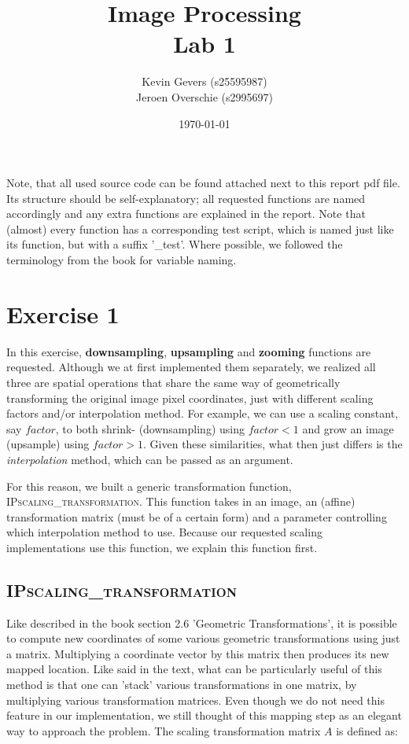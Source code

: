 \documentclass{article}
\title{Image Processing\\
    Lab 1}
\author{Kevin Gevers (s25595987) \\ Jeroen Overschie (s2995697)}
\date{\today}
\begin{document}
\maketitle

Note, that all used source code can be found attached next to this report pdf file. Its structure should be self-explanatory; all requested functions are named accordingly and any extra functions are explained in the report. Note that (almost) every function has a corresponding test script, which is named just like its function, but with a suffix '\_test'. Where possible, we followed the terminology from the book \citep{gonzalez2008digital} for variable naming.

\section*{Exercise 1}
In this exercise, \textbf{downsampling}, \textbf{upsampling} and \textbf{zooming} functions are requested. Although we at first implemented them separately, we realized all three are spatial operations that share the same way of geometrically transforming the original image pixel coordinates, just with different scaling factors and/or interpolation method. For example, we can use a scaling constant, say $factor$, to both shrink- (downsampling) using $factor < 1$ and grow an image (upsample) using $factor > 1$. Given these similarities, what then just differs is the \textit{interpolation} method, which can be passed as an argument.

For this reason, we built a generic transformation function, \textsc{IPscaling\_transformation}. This function takes in an image, an (affine) transformation matrix (must be of a certain form) and a parameter controlling which interpolation method to use. Because our requested scaling implementations use this function, we explain this function first.

\subsection*{\textsc{IPscaling\_transformation}}
Like described in the book \citep{gonzalez2008digital} section 2.6 'Geometric Transformations', it is possible to compute new coordinates of some various geometric transformations using just a matrix. Multiplying a coordinate vector by this matrix then produces its new mapped location. Like said in the text, what can be particularly useful of this method is that one can 'stack' various transformations in one matrix, by multiplying various transformation matrices. Even though we do not need this feature in our implementation, we still thought of this mapping step as an elegant way to approach the problem. The scaling transformation matrix $A$ is defined as:
\end{document}
